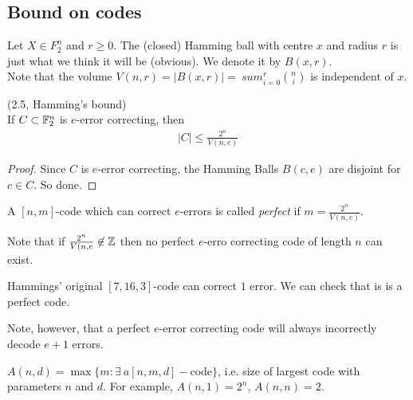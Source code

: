 \documentclass[a4paper]{article}
\begin{document}
\subsection{Bound on codes}
\begin{defi}
Let $X \in F_2^n$ and $r \geq 0$. The (closed) Hamming ball with centre $x$ and radius $r$ is just what we think it will be (obvious). We denote it by $B(x,r)$.\\
Note that the volume $V(n,r) = |B(x,r)| =\ sum_{i=0}^r {n \choose i}$ is independent of $x$.
\end{defi}

\begin{lemma} (2.5, Hamming's bound)\\
If $C \subset \mathbb{F}_2^n$ is $e$-error correcting, then
\begin{equation*}
\begin{aligned}
|C| \leq \frac{2^n}{V(n,e)}
\end{aligned}
\end{equation*}
\begin{proof}
Since $C$ is $e$-error correcting, the Hamming Balls $B(c,e)$ are disjoint for $c \in C$. So done.
\end{proof}
\end{lemma}

\begin{defi}
A $[n,m]$-code which can correct $e$-errors is called \emph{perfect} if $m=\frac{2^n}{V(n,e)}$.
\end{defi}

Note that if $\frac{2^n}{V(n,e} \not\in \mathbb{Z}$ then no perfect $e$-erro correcting code of length $n$ can exist.

\begin{eg}
Hammings' original $[7,16,3]$-code can correct $1$ error. We can check that is is a perfect code.
\end{eg}

Note, however, that a perfect $e$-error correcting code will always incorrectly decode $e+1$ errors.

\begin{defi}
$A(n,d) = \max \{m: \exists\ a [n,m,d]-$code$\}$, i.e. size of largest code with parameters $n$ and $d$. For example, $A(n,1) = 2^n$, $A(n,n) = 2$.
\end{defi}
\end{document}
